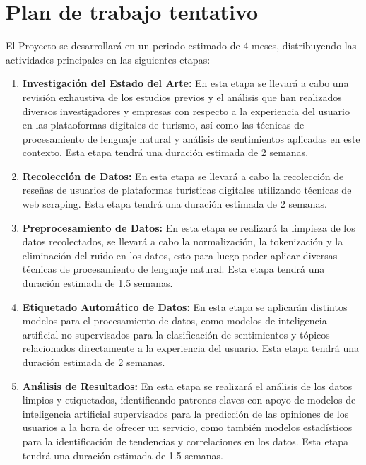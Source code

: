 \documentclass[12pt, letterpaper]{report} %
\begin{document}
    \section*{Plan de trabajo tentativo}

    El Proyecto se desarrollará en un periodo estimado de 4 meses, distribuyendo las actividades principales en las siguientes
    etapas:

    \begin{enumerate}
        \item \textbf{Investigación del Estado del Arte:} En esta etapa se llevará a cabo una revisión exhaustiva de los estudios
               previos y el análisis que han realizados diversos investigadores y empresas con respecto a la experiencia del usuario 
               en las plataoformas digitales de turismo, así como las técnicas de procesamiento de lenguaje natural y análisis de sentimientos 
               aplicadas en este contexto. Esta etapa tendrá una duración estimada de 2 semanas.

        \item \textbf{Recolección de Datos:} En esta etapa se llevará a cabo la recolección de reseñas de usuarios de plataformas turísticas 
               digitales utilizando técnicas de web scraping. Esta etapa tendrá una duración estimada de 2 semanas.

        \item \textbf{Preprocesamiento de Datos:} En esta etapa se realizará la limpieza de los datos recolectados, se llevará a cabo la normalización,
              la tokenización y la eliminación del ruido en los datos, esto para luego poder aplicar diversas técnicas de procesamiento de lenguaje natural.
              Esta etapa tendrá una duración estimada de 1.5 semanas.

        \item \textbf{Etiquetado Automático de Datos:} En esta etapa se aplicarán distintos modelos para el procesamiento de datos, como modelos de inteligencia
                artificial no supervisados para la clasificación de sentimientos y tópicos relacionados directamente a la experiencia del usuario. Esta etapa tendrá
                una duración estimada de 2 semanas.

        \item \textbf{Análisis de Resultados:} En esta etapa se realizará el análisis de los datos limpios y etiquetados, identificando patrones claves con apoyo de 
                modelos de inteligencia artificial supervisados para la predicción de las opiniones de los usuarios a la hora de ofrecer un servicio, como también
                modelos estadísticos para la identificación de tendencias y correlaciones en los datos. Esta etapa tendrá una duración estimada de 1.5 semanas.


\end{enumerate}
\end{document}

